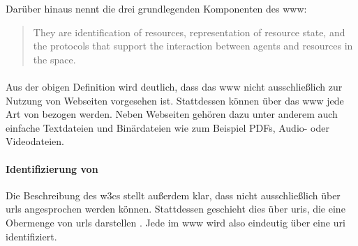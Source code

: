             Darüber hinaus nennt \cite{w3c:wwwArch} die drei grundlegenden Komponenten des \gls{www}:

            \begin{quote}
                They are identification of resources,
                representation of resource state, and the protocols
                that support the interaction between agents and resources in the space.
            \end{quote}

            \paragraph*{\resources}
            Aus der obigen Definition wird deutlich,
            dass das \gls{www} nicht ausschließlich zur Nutzung von Webseiten
            vorgesehen ist.
            Stattdessen können über das \gls{www} jede Art von {\resources} bezogen werden.
            Neben Webseiten gehören dazu unter anderem auch einfache Textdateien
            und Binärdateien wie zum Beispiel PDFs, Audio- oder Videodateien.

            \paragraph*{Identifizierung von \resources}
            Die Beschreibung des \glspl{w3c} stellt außerdem klar,
            dass {\resources} nicht ausschließlich über \glspl{url} angesprochen werden können.
            Stattdessen geschieht dies über \glspl{uri}, die eine Obermenge von \glspl{url} darstellen
            \cite[Kapitel 1.1.3, Seite 7]{rfc:3986}.
            Jede {\resource} im \gls{www} wird also eindeutig über eine \gls{uri} identifiziert.


